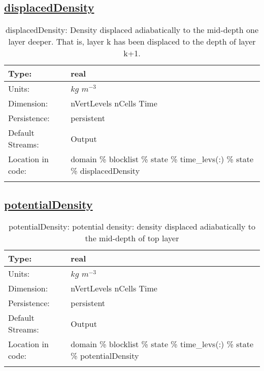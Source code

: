 \subsection[displacedDensity]{\hyperref[sec:var_tab_state]{displacedDensity}}
\label{subsec:var_sec_state_displacedDensity}
\begin{center}
\begin{longtable}{| p{2.0in} | p{4.0in} |}
        \hline 
        Type: & real \\
        \hline 
        Units: & $kg$ $m^{-3}$ \\
        \hline 
        Dimension: & nVertLevels nCells Time \\
        \hline 
        Persistence: & persistent \\
        \hline 
		 Default Streams: & Output  \\
        \hline 
		 Location in code: & domain \% blocklist \% state \% time\_levs(:) \% state \% displacedDensity \\
		 \hline 
    \caption{displacedDensity: Density displaced adiabatically to the mid-depth one layer deeper.  That is, layer k has been displaced to the depth of layer k+1.}
\end{longtable}
\end{center}
\subsection[potentialDensity]{\hyperref[sec:var_tab_state]{potentialDensity}}
\label{subsec:var_sec_state_potentialDensity}
\begin{center}
\begin{longtable}{| p{2.0in} | p{4.0in} |}
        \hline 
        Type: & real \\
        \hline 
        Units: & $kg$ $m^{-3}$ \\
        \hline 
        Dimension: & nVertLevels nCells Time \\
        \hline 
        Persistence: & persistent \\
        \hline 
		 Default Streams: & Output  \\
        \hline 
		 Location in code: & domain \% blocklist \% state \% time\_levs(:) \% state \% potentialDensity \\
		 \hline 
    \caption{potentialDensity: potential density: density displaced adiabatically to the mid-depth of top layer}
\end{longtable}
\end{center}
